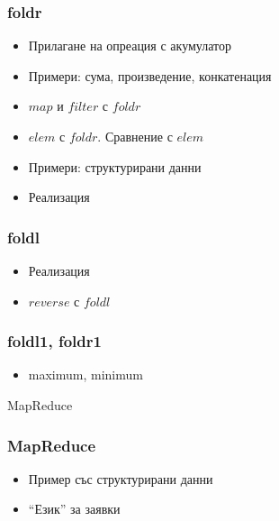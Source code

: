 \documentclass{beamer}
\begin{document}
\begin{frame}[fragile]
  \frametitle{foldr}

  \begin{itemize}
    \item Прилагане на опреация с акумулатор
    \item Примери: сума, произведение, конкатенация
    \item $map$ и $filter$ с $foldr$
    \item $elem$ с $foldr$. Сравнение с $elem$
    \item Примери: структурирани данни
    \item Реализация
  \end{itemize}

\end{frame}


\begin{frame}[fragile]
  \frametitle{foldl}

  \begin{itemize}
    \item Реализация
    \item $reverse$ с $foldl$
  \end{itemize}
\end{frame}

\begin{frame}[fragile]
  \frametitle{foldl1, foldr1}

  \begin{itemize}
    \item maximum, minimum
  \end{itemize}
\end{frame}


\begin{frame}
  \centerline{MapReduce}
\end{frame}


\begin{frame}[fragile]
  \frametitle{MapReduce}



  \begin{itemize}
    \item Пример със структурирани данни
    \item ``Език'' за заявки
  \end{itemize}

\end{frame}
\end{document}

